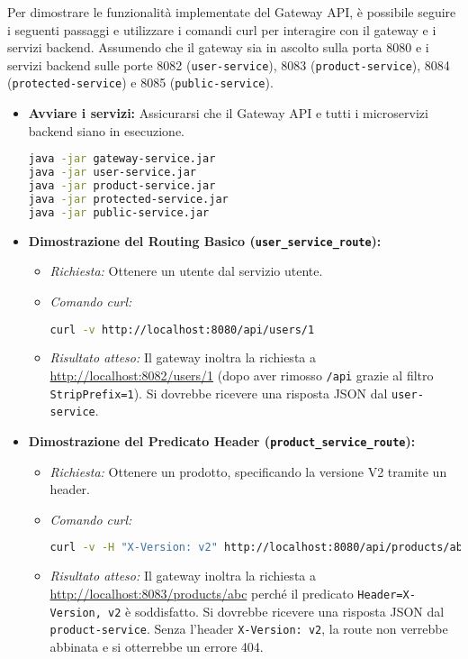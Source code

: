 Per dimostrare le funzionalità implementate del Gateway API, è possibile seguire i seguenti passaggi e utilizzare i comandi curl per interagire con il gateway e i servizi backend. Assumendo che il gateway sia in ascolto sulla porta 8080 e i servizi backend sulle porte 8082 (\texttt{user-service}), 8083 (\texttt{product-service}), 8084 (\texttt{protected-service}) e 8085 (\texttt{public-service}).
\begin{itemize}
    \item \textbf{Avviare i servizi:} Assicurarsi che il Gateway API e tutti i microservizi backend siano in esecuzione.
    \begin{lstlisting}[language=bash, caption=Comandi di avvio dei servizi]
java -jar gateway-service.jar
java -jar user-service.jar
java -jar product-service.jar
java -jar protected-service.jar
java -jar public-service.jar
    \end{lstlisting}

    \item \textbf{Dimostrazione del Routing Basico (\texttt{user\_service\_route}):}
    \begin{itemize}
        \item \textit{Richiesta:} Ottenere un utente dal servizio utente.
        \item \textit{Comando curl:}
        \begin{lstlisting}[language=bash]
curl -v http://localhost:8080/api/users/1
        \end{lstlisting}
        \item \textit{Risultato atteso:} Il gateway inoltra la richiesta a \url{http://localhost:8082/users/1} (dopo aver rimosso \texttt{/api} grazie al filtro \texttt{StripPrefix=1}). Si dovrebbe ricevere una risposta JSON dal \texttt{user-service}.
    \end{itemize}

    \item \textbf{Dimostrazione del Predicato Header (\texttt{product\_service\_route}):}
    \begin{itemize}
        \item \textit{Richiesta:} Ottenere un prodotto, specificando la versione V2 tramite un header.
        \item \textit{Comando curl:}
        \begin{lstlisting}[language=bash]
curl -v -H "X-Version: v2" http://localhost:8080/api/products/abc
        \end{lstlisting}
        \item \textit{Risultato atteso:} Il gateway inoltra la richiesta a \url{http://localhost:8083/products/abc} perché il predicato \texttt{Header=X-Version, v2} è soddisfatto. Si dovrebbe ricevere una risposta JSON dal \texttt{product-service}. Senza l'header \texttt{X-Version: v2}, la route non verrebbe abbinata e si otterrebbe un errore 404.
    \end{itemize}


\end{itemize}
